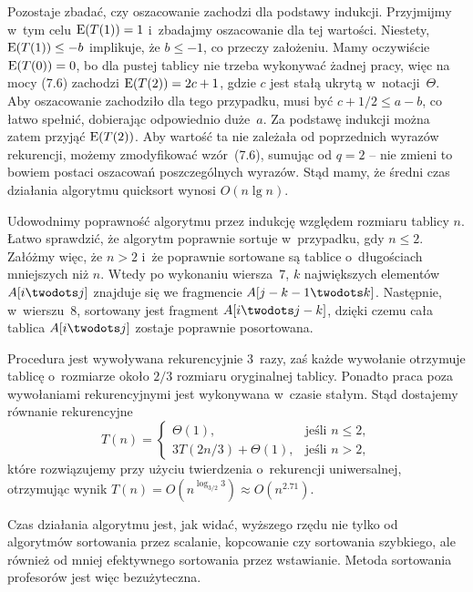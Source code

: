 Pozostaje zbadać, czy oszacowanie zachodzi dla podstawy indukcji. Przyjmijmy w~tym celu $\operatorname{E}(T(1))=1$ i~zbadajmy oszacowanie dla tej wartości. Niestety, $\operatorname{E}(T(1))\le-b$ implikuje, że $b\le-1$, co przeczy założeniu. Mamy oczywiście $\operatorname{E}(T(0))=0$, bo dla pustej tablicy nie trzeba wykonywać żadnej pracy, więc na mocy (7.6) zachodzi $\operatorname{E}(T(2))=2c+1$, gdzie $c$ jest stałą ukrytą w~notacji~$\Theta$. Aby oszacowanie zachodziło dla tego przypadku, musi być $c+1/2\le a-b$, co łatwo spełnić, dobierając odpowiednio duże~$a$. Za podstawę indukcji można zatem przyjąć $\operatorname{E}(T(2))$. Aby wartość ta nie zależała od poprzednich wyrazów rekurencji, możemy zmodyfikować wzór~(7.6), sumując od $q=2$ -- nie zmieni to bowiem postaci oszacowań poszczególnych wyrazów. Stąd mamy, że średni czas działania algorytmu quicksort wynosi $O(n\lg n)$.


\subproblem %
Udowodnimy poprawność algorytmu przez indukcję względem rozmiaru tablicy $n$. Łatwo sprawdzić, że algorytm poprawnie sortuje w~przypadku, gdy $n\le2$. Załóżmy więc, że $n>2$ i~że poprawnie sortowane są tablice o~długościach mniejszych niż $n$. Wtedy po wykonaniu wiersza~7, $k$ największych elementów $A[i\twodots j]$ znajduje się we fragmencie $A[j-k-1\twodots k]$. Następnie, w~wierszu~8, sortowany jest fragment $A[i\twodots j-k]$, dzięki czemu cała tablica $A[i\twodots j]$ zostaje poprawnie posortowana.

\subproblem %
Procedura jest wywoływana rekurencyjnie 3~razy, zaś każde wywołanie otrzymuje tablicę o~rozmiarze około $2/3$ rozmiaru oryginalnej tablicy. Ponadto praca poza wywołaniami rekurencyjnymi jest wykonywana w~czasie stałym. Stąd dostajemy równanie rekurencyjne
\[
	T(n) =
	\begin{cases}
		\Theta(1), & \text{jeśli $n\le2$}, \\
		3T(2n/3)+\Theta(1), & \text{jeśli $n>2$},
	\end{cases}
\]
które rozwiązujemy przy użyciu twierdzenia o~rekurencji uniwersalnej, otrzymując wynik $T(n)=O(n^{\log_{3/2}3})\approx O(n^{2{.}71})$.

\subproblem %
Czas działania algorytmu  jest, jak widać, wyższego rzędu nie tylko od algorytmów sortowania przez scalanie, kopcowanie czy sortowania szybkiego, ale również od mniej efektywnego sortowania przez wstawianie. Metoda sortowania profesorów jest więc bezużyteczna.


